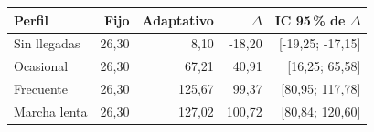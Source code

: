 \begin{tabular}{lrrrr}
\toprule
Perfil & Fijo & Adaptativo & $\Delta$ & IC 95\,\% de $\Delta$\\\midrule
Sin llegadas & 26,30 & 8,10 & -18,20 & [-19,25; -17,15]\\
Ocasional & 26,30 & 67,21 & 40,91 & [16,25; 65,58]\\
Frecuente & 26,30 & 125,67 & 99,37 & [80,95; 117,78]\\
Marcha lenta & 26,30 & 127,02 & 100,72 & [80,84; 120,60]\\
\bottomrule
\end{tabular}

